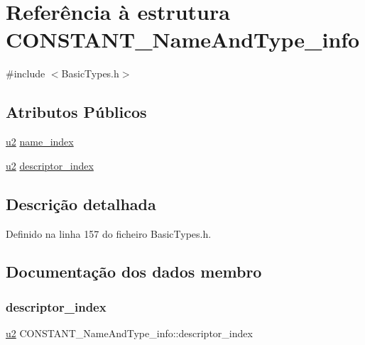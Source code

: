 \hypertarget{structCONSTANT__NameAndType__info}{}\section{Referência à estrutura C\+O\+N\+S\+T\+A\+N\+T\+\_\+\+Name\+And\+Type\+\_\+info}
\label{structCONSTANT__NameAndType__info}


{\ttfamily \#include $<$Basic\+Types.\+h$>$}

\subsection*{Atributos Públicos}
\begin{DoxyCompactItemize}
\item 
\hyperlink{BasicTypes_8h_a732cde1300aafb73b0ea6c2558a7a54f}{u2} \hyperlink{structCONSTANT__NameAndType__info_adbaa813f9f3a32dc04a8bc65b5b2433d}{name\+\_\+index}
\item 
\hyperlink{BasicTypes_8h_a732cde1300aafb73b0ea6c2558a7a54f}{u2} \hyperlink{structCONSTANT__NameAndType__info_a5066151677d138f5ee57e5e16efd4d5e}{descriptor\+\_\+index}
\end{DoxyCompactItemize}


\subsection{Descrição detalhada}


Definido na linha 157 do ficheiro Basic\+Types.\+h.



\subsection{Documentação dos dados membro}
\mbox{\label{structCONSTANT__NameAndType__info_a5066151677d138f5ee57e5e16efd4d5e}} 
\subsubsection{\texorpdfstring{descriptor\+\_\+index}{descriptor\_index}}
{\footnotesize\ttfamily \hyperlink{BasicTypes_8h_a732cde1300aafb73b0ea6c2558a7a54f}{u2} C\+O\+N\+S\+T\+A\+N\+T\+\_\+\+Name\+And\+Type\+\_\+info\+::descriptor\+\_\+index}



